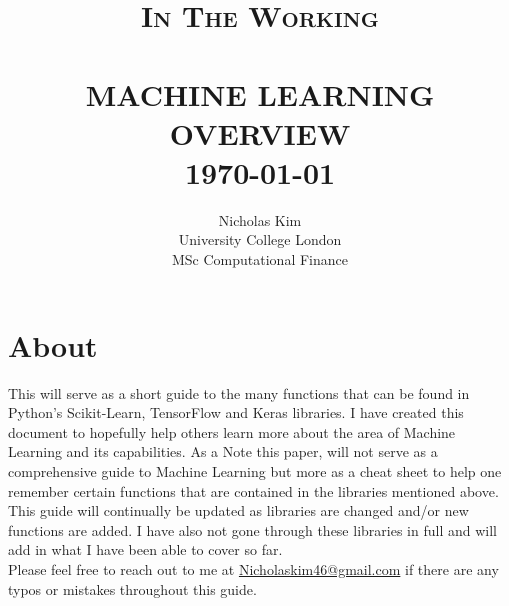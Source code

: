 \documentclass[11pt]{article}
\title{	\normalsize \textsc{In The Working} 	%
		 	\\[2.0cm]								%
			\HRule{1pt} \\						%
			\LARGE \textbf{\uppercase{Machine Learning Overview}}	%
			\HRule{2pt} \\ [0.5cm]		%
			\normalsize \today			%
		}
\author{
		Nicholas Kim\\	
		University College London\\	
		MSc Computational Finance \\ 
}
\makeatletter
\def\printtitle{%
    {\centering \@title\par}}
\def\printauthor{%
    {\centering \large \@author}}
\makeatother
\begin{document}
\thispagestyle{empty}

\printtitle
        \vfill
\printauthor
\newpage

\setcounter{page}{1}
\section*{About}

This will serve as a short guide to the many functions that can be found in Python's
Scikit-Learn, TensorFlow and Keras libraries. I have created this document to hopefully 
help others learn more about the area of Machine Learning and its capabilities. As a Note
this paper, will not serve as a comprehensive guide to Machine Learning but more as a 
cheat sheet to help one remember certain functions that are contained in the libraries 
mentioned above. \\

\noindent 
This guide will continually be updated as libraries are changed and/or new 
functions are added. I have also not gone through these libraries in full and will add 
in what I have been able to cover so far. \\ 

\noindent 
Please feel free to reach out to me at 
\href{mailto:Nicholaskim46@gmail.com}{Nicholaskim46@gmail.com} if there are any typos or
mistakes throughout this guide.

\pagebreak

\tableofcontents

\pagebreak














\end{document}
